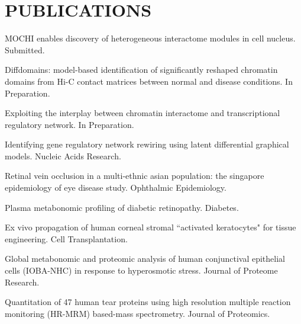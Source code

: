 \documentclass[paper=letter,fontsize=10pt]{scrartcl} %
\newcommand{\NewPart}[2]{\section*{\uppercase{#1} #2}}
\newcommand{\PaperEntry}[7]{
		\noindent #2. #3.}
\newcommand{\ManEntry}[3]{
		\noindent #2. #3.}
\begin{document}
\NewPart{Publications}{}
\begin{etaremune}
\item \ManEntry{\textbf{Tian D}$^\star$, Zhang R$^\star$, Zhang Y, and Ma J}{MOCHI enables discovery of heterogeneous interactome modules in cell nucleus}{Submitted}
\item \ManEntry{\textbf{Tian D}$^\star$, Zhu X$^\star$, and Ma J}{Diffdomains: model-based identification of significantly reshaped chromatin domains from Hi-C contact matrices between normal and disease conditions} { In Preparation}
\item \ManEntry{\textbf{Tian D} and Ma J}{Exploiting the interplay between chromatin interactome and transcriptional regulatory network}{In Preparation}
\item \PaperEntry{\textbf{Tian D}, Gu Q and Ma J}{Identifying gene regulatory network rewiring using latent differential graphical models}{Nucleic Acids Research}{44}{17}{2016}{https://academic.oup.com/nar/article/44/17/e140/2468041}  
\item \PaperEntry{Koh V, Cheung C, Li X, \textbf{Tian D}, Wang J.J, Mitchell P, Cheng C.Y, and Wong T.T}{Retinal vein occlusion in a multi-ethnic asian population: the singapore epidemiology of eye disease study}{Ophthalmic Epidemiology}{23}{1}{2016}{https://www.tandfonline.com/doi/abs/10.3109/09286586.2015.1082604}
\item \PaperEntry{Chen L, Cheng C.Y, Choi H, Ikram M.K, Sabanayagam C, Tan G.S, \textbf{Tian D}, Zhang L, Venkatesan G, Tai E.S, Wang J.J, Mitchell P, Cheung C.M.G, Beuerman R.W, Zhou L, Chan E.C.Y, Wong T.T}{Plasma metabonomic profiling of diabetic retinopathy}{Diabetes}{65}{4}{2016}{http://diabetes.diabetesjournals.org/content/early/2016/01/14/db15-0661.short}
\item \PaperEntry{Yam G.H.F, Yusoff N.Z.B.M, Kadaba A, \textbf{Tian D}, Myint H.H,  Beuerman R.W, Zhou L, Mehta J.S}{Ex vivo propagation of human corneal stromal ``activated keratocytes" for tissue engineering}{Cell Transplantation}{24}{9}{2015}{https://www.ingentaconnect.com/content/cog/ct/2015/00000024/00000009/art00013}
\item \PaperEntry{Chen L, Li J, Guo T, Ghosh S, Koh S.K, \textbf{Tian D}, Zhang L, Jia D, Beuerman R.W, Aebersold R, Chan E.C.Y, Zhou L}{Global metabonomic and proteomic analysis of human conjunctival epithelial cells (IOBA-NHC) in response to hyperosmotic stress}{Journal of Proteome Research}{14}{9}{2015}{https://pubs.acs.org/doi/abs/10.1021/acs.jproteome.5b00443}
\item \PaperEntry{Tong L, Zhou X, Jylha A, Aapola U, Liu D.N, Koh S.W, \textbf{Tian D}, Quah J, Uusitalo H, Beuerman R.W, Zhou L}{Quantitation of 47 human tear proteins using high resolution multiple reaction monitoring (HR-MRM) based-mass spectrometry}{Journal of Proteomics}{115}{}{2015}{https://www.sciencedirect.com/science/article/pii/S1874391914005557}

\end{etaremune}
\end{document}
